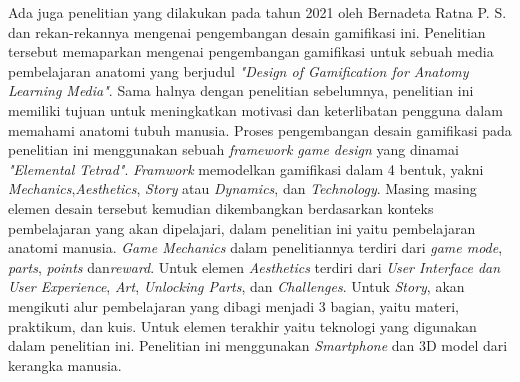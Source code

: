Ada juga penelitian yang dilakukan pada tahun 2021 oleh Bernadeta Ratna P. S. dan rekan-rekannya mengenai pengembangan desain gamifikasi ini.
Penelitian tersebut memaparkan mengenai pengembangan gamifikasi untuk sebuah media pembelajaran anatomi yang berjudul \textit{"Design of Gamification for Anatomy Learning Media"}.
Sama halnya dengan penelitian sebelumnya, penelitian ini memiliki tujuan untuk meningkatkan motivasi dan keterlibatan pengguna dalam memahami anatomi tubuh manusia.
Proses pengembangan desain gamifikasi pada penelitian ini menggunakan sebuah \textit{framework game design} yang dinamai \textit{"Elemental Tetrad"}.
\textit{Framwork} memodelkan gamifikasi dalam 4 bentuk, yakni \textit{Mechanics},\textit{Aesthetics}, \textit{Story} atau \textit{Dynamics}, dan \textit{Technology}.
Masing masing elemen desain tersebut kemudian dikembangkan berdasarkan konteks pembelajaran yang akan dipelajari, dalam penelitian ini yaitu pembelajaran anatomi manusia.
\textit{Game Mechanics} dalam penelitiannya terdiri dari \textit{game mode}, \textit{parts}, \textit{points} dan\textit{reward}. 
Untuk elemen \textit{Aesthetics} terdiri dari \textit{ User Interface dan User Experience}, \textit{Art}, \textit{Unlocking Parts}, dan \textit{Challenges}.
Untuk \textit{Story}, akan mengikuti alur pembelajaran yang dibagi menjadi 3 bagian, yaitu materi, praktikum, dan kuis.
Untuk elemen terakhir yaitu teknologi yang digunakan dalam penelitian ini. Penelitian ini menggunakan \textit{Smartphone} dan 3D model dari kerangka manusia.
